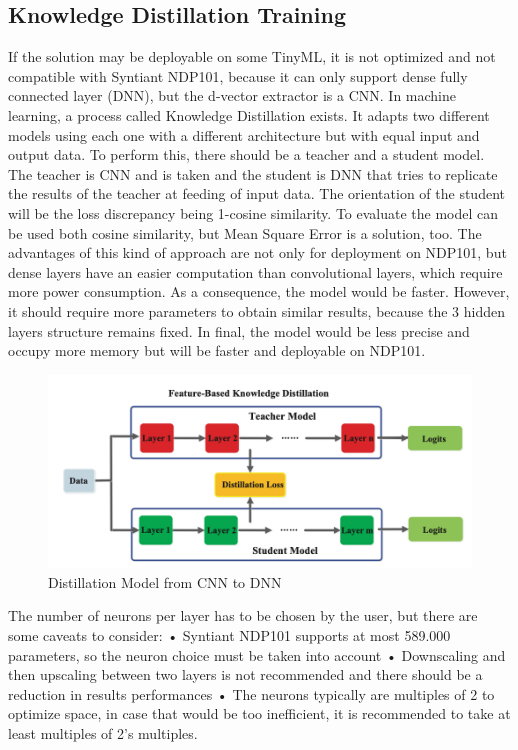 \subsection{Knowledge Distillation Training}
If the solution may be deployable on some TinyML, it is not optimized and not compatible with Syntiant NDP101, because it can only support dense fully connected layer (DNN), but the d-vector extractor is a CNN\cite{distillation_from_cnn_to_dnn}\cite{knowledge_distillation}. In machine learning, a process called Knowledge Distillation exists. It adapts two different models using each one with a different architecture but with equal input and output data. To perform this, there should be a teacher and a student model. The teacher is CNN and is taken and the student is DNN that tries to replicate the results of the teacher at feeding of input data. The orientation of the student will be the loss discrepancy being 1-cosine similarity. To evaluate the model can be used both cosine similarity, but Mean Square Error is a solution, too. The advantages of this kind of approach are not only for deployment on NDP101, but dense layers have an easier computation than convolutional layers, which require more power consumption. As a consequence, the model would be faster. However, it should require more parameters to obtain similar results, because the 3 hidden layers structure remains fixed. In final, the model would be less precise and occupy more memory but will be faster and deployable on NDP101.
\begin{center}
\begin{figure}[!h]
        \centering
        \includegraphics[width=1.0\textwidth]{images/3.03 Distillation Technique.png}
        \caption{Distillation Model from CNN to DNN}
    \end{figure}
\end{center}
The number of neurons per layer has to be chosen by the user, but there are some caveats to consider:\newline
• Syntiant NDP101 supports at most 589.000 parameters, so the neuron choice must be taken into account\newline
• Downscaling and then upscaling between two layers is not recommended and there should be a reduction in results performances\newline
• The neurons typically are multiples of 2 to optimize space, in case that would be too inefficient, it is recommended to take at least multiples of 2's multiples.\newline
